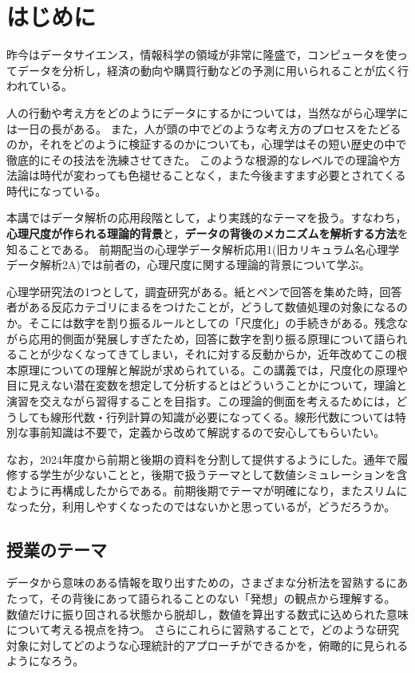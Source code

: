 \section*{はじめに}
昨今はデータサイエンス，情報科学の領域が非常に隆盛で，コンピュータを使ってデータを分析し，経済の動向や購買行動などの予測に用いられることが広く行われている。

人の行動や考え方をどのようにデータにするかについては，当然ながら心理学には一日の長がある。
また，人が頭の中でどのような考え方のプロセスをたどるのか，それをどのように検証するのかについても，心理学はその短い歴史の中で徹底的にその技法を洗練させてきた。
このような根源的なレベルでの理論や方法論は時代が変わっても色褪せることなく，また今後ますます必要とされてくる時代になっている。

本講ではデータ解析の応用段階として，より実践的なテーマを扱う。すなわち，\textbf{心理尺度が作られる理論的背景}と，\textbf{データの背後のメカニズムを解析する方法}を知ることである。
前期配当の心理学データ解析応用1(旧カリキュラム名心理学データ解析2A)では前者の，心理尺度に関する理論的背景について学ぶ。

心理学研究法の1つとして，調査研究がある。紙とペンで回答を集めた時，回答者がある反応カテゴリにまるをつけたことが，どうして数値処理の対象になるのか。そこには数字を割り振るルールとしての「尺度化」の手続きがある。残念ながら応用的側面が発展しすぎたため，回答に数字を割り振る原理について語られることが少なくなってきてしまい，それに対する反動からか，近年改めてこの根本原理についての理解と解説が求められている。この講義では，尺度化の原理や目に見えない潜在変数を想定して分析するとはどういうことかについて，理論と演習を交えながら習得することを目指す。この理論的側面を考えるためには，どうしても線形代数・行列計算の知識が必要になってくる。線形代数については特別な事前知識は不要で，定義から改めて解説するので安心してもらいたい。

なお，2024年度から前期と後期の資料を分割して提供するようにした。通年で履修する学生が少ないことと，後期で扱うテーマとして数値シミュレーションを含むように再構成したからである。前期後期でテーマが明確になり，またスリムになった分，利用しやすくなったのではないかと思っているが，どうだろうか。

\subsection*{授業のテーマ}
データから意味のある情報を取り出すための，さまざまな分析法を習熟するにあたって，その背後にあって語られることのない「発想」の観点から理解する。
数値だけに振り回される状態から脱却し，数値を算出する数式に込められた意味について考える視点を持つ。
さらにこれらに習熟することで，どのような研究対象に対してどのような心理統計的アプローチができるかを，俯瞰的に見られるようになろう。

